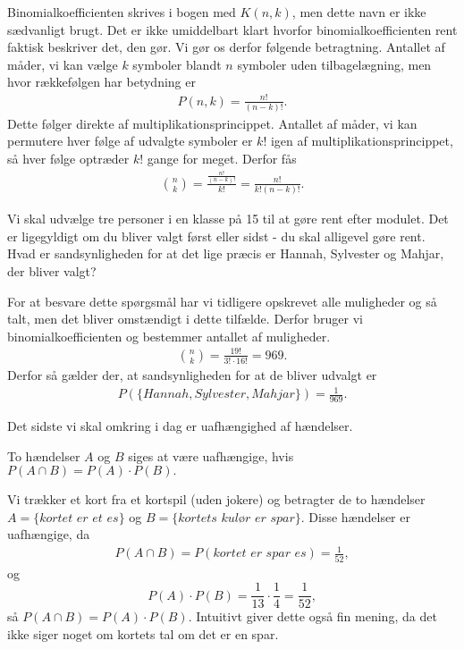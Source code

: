 Binomialkoefficienten skrives i bogen med $K(n,k)$, men dette navn er ikke sædvanligt brugt.
Det er ikke umiddelbart klart hvorfor binomialkoefficienten rent faktisk beskriver det, den gør. Vi gør os derfor følgende betragtning. Antallet af måder, vi kan vælge $k$ symboler blandt $n$ symboler uden tilbagelægning, men hvor rækkefølgen har betydning er 
\begin{align*}
P(n,k) = \frac{n!}{(n-k)!}.
\end{align*}
Dette følger direkte af multiplikationsprincippet.
Antallet af måder, vi kan permutere hver følge af udvalgte symboler er $k!$ igen af multiplikationsprincippet, så hver følge optræder $k!$ gange for meget. Derfor fås 
\begin{align*}
\binom{n}{k} = \frac{\frac{n!}{(n-k)!}}{k!} =\frac{n!}{k!(n-k)!} .
\end{align*}
\begin{exa}
Vi skal udvælge tre personer i en klasse på 15 til at gøre rent efter modulet. Det er ligegyldigt om du bliver valgt først eller sidst - du skal alligevel gøre rent. Hvad er sandsynligheden for at det lige præcis er Hannah, Sylvester og Mahjar, der bliver valgt? 

For at besvare dette spørgsmål har vi tidligere opskrevet alle muligheder og så talt, men det bliver omstændigt i dette tilfælde. Derfor bruger vi binomialkoefficienten og bestemmer antallet af muligheder.
\begin{align*}
\binom{n}{k} = \frac{19!}{3!\cdot 16!} = 969.
\end{align*}
Derfor så gælder der, at sandsynligheden for at de bliver udvalgt er
\begin{align*}
P(\{Hannah,Sylvester,Mahjar\}) = \frac{1}{969}.
\end{align*}
\end{exa}
Det sidste vi skal omkring i dag er uafhængighed af hændelser.
\begin{defn}
To hændelser $A$ og $B$ siges at være uafhængige, hvis $P(A \cap B) = P(A)\cdot P(B).$
\end{defn}
\begin{exa}
Vi trækker et kort fra et kortspil (uden jokere) og betragter de to hændelser $A= \{\textit{kortet er et es}\}$ og $B=\{\textit{kortets kulør er spar}\}$. Disse hændelser er uafhængige, da 
\begin{align*}
P(A \cap B) = P({\textit{kortet er spar es}}) = \frac{1}{52},
\end{align*}
og 
\[
P(A)\cdot P(B) = \frac{1}{13} \cdot \frac{1}{4} = \frac{1}{52}, 
\]
så $P(A\cap B) = P(A)\cdot P(B).$
Intuitivt giver dette også fin mening, da det ikke siger noget om kortets tal om det er en spar.
\end{exa}
